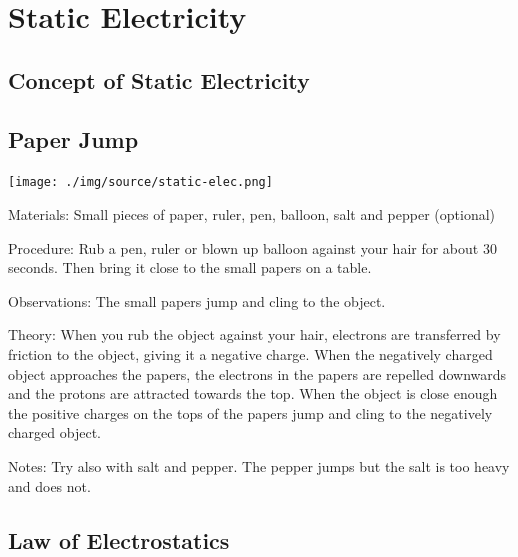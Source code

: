 \section{Static Electricity}

\begin{multicols}{2}


\section*{Concept of Static Electricity}


\subsection{Paper Jump}

\begin{center}
\texttt{[image: ./img/source/static-elec.png]}
\end{center}

\begin{description*}
\item[Materials:]{Small pieces of paper, ruler, pen, balloon, salt and pepper (optional)}
\item[Procedure:]{Rub a pen, ruler or blown up balloon against your hair for about 30 seconds. Then bring it close to the small papers on a table.}
\item[Observations:]{The small papers jump and cling to the object.}
\item[Theory:]{When you rub the object against your hair, electrons are transferred by friction to the object, giving it a negative charge. When the negatively charged object approaches the papers, the electrons in the papers are repelled downwards and the protons are attracted towards the top. When the object is close enough the positive charges on the tops of the papers jump and cling to the negatively charged object.}
\item[Notes:]{Try also with salt and pepper. The pepper jumps but the salt is too heavy and does not.}
\end{description*}

\vfill
\columnbreak

\subsection{Law of Electrostatics}


\end{multicols}
